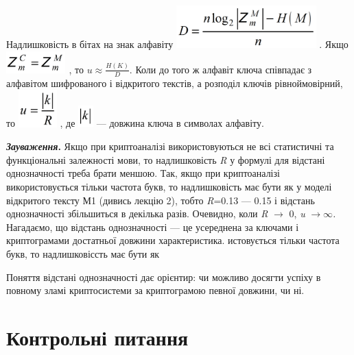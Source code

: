 Надлишковість в бітах на знак алфавіту 
\includegraphics[width=2.122in,height=0.65in]{crypt-img/crypt-img51.png} . Якщо
  \includegraphics[width=0.9047in,height=0.3311in]{crypt-img/crypt-img52.png} ,
 то   $u\approx \frac{H(K)}D$.  Коли до того ж алфавіт ключа співпадає з
алфавітом шифрованого і відкритого текстів, а розподіл ключів  рівноймовірний,
то  
\includegraphics[width=0.5862in,height=0.5665in]{crypt-img/crypt-img53.png} , 
де  
\includegraphics[width=0.2291in,height=0.3335in]{crypt-img/crypt-img54.png}  ---
довжина ключа в символах алфавіту.

\textbf{\textit{Зауваження}}\textbf{.} Якщо при криптоаналізі використовуються
не всі статистичні та функціональні залежності мови, то надлишковість
\textit{R}\textit{ }у формулі для відстані однозначності треба брати меншою.
Так, якщо при криптоаналізі використовується тільки частота букв, то
надлишковість має бути як у моделі відкритого тексту М1 (дивись лекцію 2),
тобто \textit{R}=0.13 --- 0.15  і відстань однозначності  збільшиться в декілька
разів.  Очевидно, коли  \textit{R} $\rightarrow $ 0,\textit{  u}
$\rightarrow \infty $\textit{.  }Нагадаємо, що відстань однозначності --- це
усереднена за ключами і криптограмами достатньої  довжини характеристика. 
истовується тільки частота букв, то надлишковіссть має бути як

Поняття відстані однозначності дає орієнтир: чи можливо досягти успіху в повному
зламі криптосистеми за криптограмою певної довжини, чи ні.


\bigskip


\bigskip

\section{Контрольні питання}


